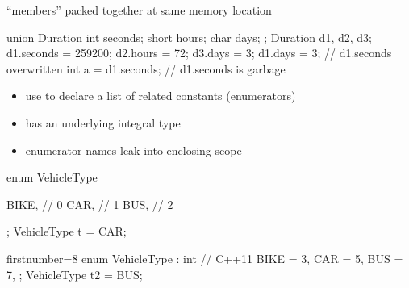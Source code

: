 \begin{frame}[fragile]
  \begin{mdframed}[style=simplebox]
    \center ``members'' packed together at same memory location
  \end{mdframed}
  \begin{multicols}{2}
    \begin{cppcode*}{}
      union Duration {
        int seconds;
        short hours;
        char days;
      };
      Duration d1, d2, d3;
      d1.seconds = 259200;
      d2.hours = 72;
      d3.days = 3;
      d1.days = 3; // d1.seconds overwritten
      int a = d1.seconds; // d1.seconds is garbage
    \end{cppcode*}
    \pause
    \columnbreak
    \null \vfill
    \vfill \null
  \end{multicols}
\end{frame}

\begin{frame}[fragile]
  \begin{block}{}
    \begin{itemize}
        \item use to declare a list of related constants (enumerators)
        \item has an underlying integral type
        \item enumerator names leak into enclosing scope
    \end{itemize}
  \end{block}
  \begin{multicols}{2}
    \begin{cppcode*}{}
      enum VehicleType {

        BIKE,  // 0
        CAR,   // 1
        BUS,   // 2
      };
      VehicleType t = CAR;
    \end{cppcode*}
    \columnbreak
    \begin{cppcode*}{firstnumber=8}
      enum VehicleType
        : int { // C++11
        BIKE = 3,
        CAR = 5,
        BUS = 7,
      };
      VehicleType t2 = BUS;
    \end{cppcode*}
  \end{multicols}
\end{frame}

